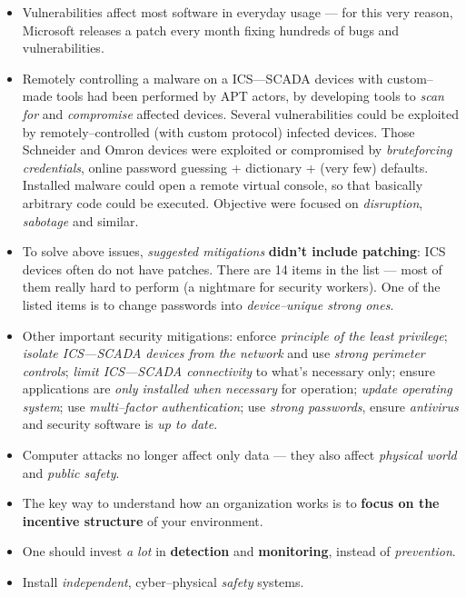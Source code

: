 \documentclass[10pt]{\classname}
\begin{document}
\begin{itemize}
    \item Vulnerabilities affect most software in everyday usage --- for this
        very reason, Microsoft releases a patch every month fixing hundreds of
        bugs and vulnerabilities.
    \item Remotely controlling a malware on a ICS---SCADA devices with
        custom--made tools had been performed by APT actors, by developing
        tools to \emph{scan for} and \emph{compromise} affected devices.
        Several vulnerabilities could be exploited by remotely--controlled
        (with custom protocol) infected devices. Those Schneider and Omron
        devices were exploited or compromised by \emph{bruteforcing
        credentials}, online password guessing + dictionary + (very few)
        defaults. Installed malware could open a remote virtual console, so
        that basically arbitrary code could be executed. Objective were focused
        on \emph{disruption}, \emph{sabotage} and similar.
    \item To solve above issues, \emph{suggested mitigations} \textbf{didn't
        include patching}: ICS devices often do not have patches. There are 14
        items in the list --- most of them really hard to perform (a nightmare
        for security workers). One of the listed items is to change passwords
        into \emph{device--unique strong ones}.
    \item Other important security mitigations: enforce \emph{principle of
        the least privilege}; \emph{isolate ICS---SCADA devices from the
        network} and use \emph{strong perimeter controls}; \emph{limit
        ICS---SCADA connectivity} to what's necessary only; ensure applications
        are \emph{only installed when necessary} for operation; \emph{update
        operating system}; use \emph{multi--factor authentication}; use
        \emph{strong passwords}, ensure \emph{antivirus} and security software
        is \emph{up to date}.
    \item Computer attacks no longer affect only data --- they also affect
        \emph{physical world} and \emph{public safety}.
    \item The key way to understand how an organization works is to
        \textbf{focus on the incentive structure} of your environment.
    \item One should invest \emph{a lot} in \textbf{detection} and
        \textbf{monitoring}, instead of \emph{prevention}.
    \item Install \emph{independent}, cyber--physical \emph{safety} systems.

\end{itemize}
\end{document}

